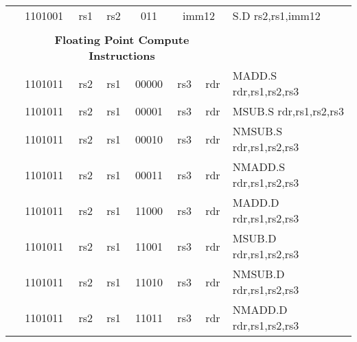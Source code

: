 \begin{table}[p]
\begin{small}
\begin{center}
\begin{tabular}{rcccccccccl}
&
\multicolumn{2}{|c|}{1101001} &
\multicolumn{1}{c|}{rs1} &
\multicolumn{1}{c|}{rs2} &
\multicolumn{1}{c|}{011} &
\multicolumn{4}{c|}{imm12} & S.D rs2,rs1,imm12 \\
\cline{2-10}
  

&
\multicolumn{9}{c}{} & \\
&
\multicolumn{9}{c}{\bf Floating Point Compute Instructions} & \\
\cline{2-10}
  

&
\multicolumn{2}{|c|}{1101011} &
\multicolumn{1}{c|}{rs2} &
\multicolumn{1}{c|}{rs1} &
\multicolumn{2}{c|}{00000} &
\multicolumn{2}{c|}{rs3} &
\multicolumn{1}{c|}{rdr} & MADD.S rdr,rs1,rs2,rs3 \\
\cline{2-10}
  

&
\multicolumn{2}{|c|}{1101011} &
\multicolumn{1}{c|}{rs2} &
\multicolumn{1}{c|}{rs1} &
\multicolumn{2}{c|}{00001} &
\multicolumn{2}{c|}{rs3} &
\multicolumn{1}{c|}{rdr} & MSUB.S rdr,rs1,rs2,rs3 \\
\cline{2-10}
  

&
\multicolumn{2}{|c|}{1101011} &
\multicolumn{1}{c|}{rs2} &
\multicolumn{1}{c|}{rs1} &
\multicolumn{2}{c|}{00010} &
\multicolumn{2}{c|}{rs3} &
\multicolumn{1}{c|}{rdr} & NMSUB.S rdr,rs1,rs2,rs3 \\
\cline{2-10}
  

&
\multicolumn{2}{|c|}{1101011} &
\multicolumn{1}{c|}{rs2} &
\multicolumn{1}{c|}{rs1} &
\multicolumn{2}{c|}{00011} &
\multicolumn{2}{c|}{rs3} &
\multicolumn{1}{c|}{rdr} & NMADD.S rdr,rs1,rs2,rs3 \\
\cline{2-10}
  

&
\multicolumn{2}{|c|}{1101011} &
\multicolumn{1}{c|}{rs2} &
\multicolumn{1}{c|}{rs1} &
\multicolumn{2}{c|}{11000} &
\multicolumn{2}{c|}{rs3} &
\multicolumn{1}{c|}{rdr} & MADD.D rdr,rs1,rs2,rs3 \\
\cline{2-10}
  

&
\multicolumn{2}{|c|}{1101011} &
\multicolumn{1}{c|}{rs2} &
\multicolumn{1}{c|}{rs1} &
\multicolumn{2}{c|}{11001} &
\multicolumn{2}{c|}{rs3} &
\multicolumn{1}{c|}{rdr} & MSUB.D rdr,rs1,rs2,rs3 \\
\cline{2-10}
  

&
\multicolumn{2}{|c|}{1101011} &
\multicolumn{1}{c|}{rs2} &
\multicolumn{1}{c|}{rs1} &
\multicolumn{2}{c|}{11010} &
\multicolumn{2}{c|}{rs3} &
\multicolumn{1}{c|}{rdr} & NMSUB.D rdr,rs1,rs2,rs3 \\
\cline{2-10}
  

&
\multicolumn{2}{|c|}{1101011} &
\multicolumn{1}{c|}{rs2} &
\multicolumn{1}{c|}{rs1} &
\multicolumn{2}{c|}{11011} &
\multicolumn{2}{c|}{rs3} &
\multicolumn{1}{c|}{rdr} & NMADD.D rdr,rs1,rs2,rs3 \\
\cline{2-10}
  


\end{tabular}
\end{center}
\end{small}
\end{table}
